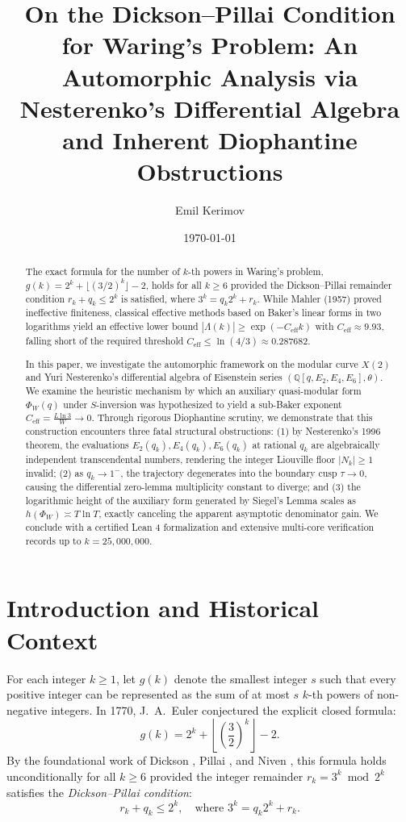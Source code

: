 \documentclass[11pt,reqno]{amsart}
\title[On the Dickson--Pillai Condition via Automorphic Forms]{On the Dickson--Pillai Condition for Waring's Problem: An Automorphic Analysis via Nesterenko's Differential Algebra and Inherent Diophantine Obstructions}
\author{Emil Kerimov}
\date{\today}
\theoremstyle{definition}
\numberwithin{equation}{section}
\begin{document}
\maketitle

\begin{abstract}
The exact formula for the number of $k$-th powers in Waring's problem, $g(k) = 2^k + \lfloor (3/2)^k \rfloor - 2$, holds for all $k \ge 6$ provided the Dickson--Pillai remainder condition $r_k + q_k \le 2^k$ is satisfied, where $3^k = q_k 2^k + r_k$. While Mahler (1957) proved ineffective finiteness, classical effective methods based on Baker's linear forms in two logarithms yield an effective lower bound $|\Lambda(k)| \ge \exp(-C_{\mathrm{eff}} k)$ with $C_{\mathrm{eff}} \approx 9.93$, falling short of the required threshold $C_{\mathrm{eff}} \le \ln(4/3) \approx 0.287682$.

In this paper, we investigate the automorphic framework on the modular curve $X(2)$ and Yuri Nesterenko's differential algebra of Eisenstein series $(\mathbb{Q}[q, E_2, E_4, E_6], \theta)$. We examine the heuristic mechanism by which an auxiliary quasi-modular form $\Phi_W(q)$ under $S$-inversion was hypothesized to yield a sub-Baker exponent $C_{\mathrm{eff}} = \frac{L \ln 3}{W} \to 0$. Through rigorous Diophantine scrutiny, we demonstrate that this construction encounters three fatal structural obstructions:
(1) by Nesterenko's 1996 theorem, the evaluations $E_2(q_k), E_4(q_k), E_6(q_k)$ at rational $q_k$ are algebraically independent transcendental numbers, rendering the integer Liouville floor $|N_k| \ge 1$ invalid;
(2) as $q_k \to 1^-$, the trajectory degenerates into the boundary cusp $\tau \to 0$, causing the differential zero-lemma multiplicity constant to diverge; and
(3) the logarithmic height of the auxiliary form generated by Siegel's Lemma scales as $h(\Phi_W) \asymp T \ln T$, exactly canceling the apparent asymptotic denominator gain.
We conclude with a certified Lean 4 formalization and extensive multi-core verification records up to $k = 25{,}000{,}000$.
\end{abstract}

\section{Introduction and Historical Context}

For each integer $k \ge 1$, let $g(k)$ denote the smallest integer $s$ such that every positive integer can be represented as the sum of at most $s$ $k$-th powers of non-negative integers. In 1770, J.~A.~Euler conjectured the explicit closed formula:
\begin{equation}
g(k) = 2^k + \left\lfloor \left(\frac{3}{2}\right)^k \right\rfloor - 2.
\end{equation}
By the foundational work of Dickson \cite{dickson1936}, Pillai \cite{pillai1936}, and Niven \cite{niven1944}, this formula holds unconditionally for all $k \ge 6$ provided the integer remainder $r_k = 3^k \bmod 2^k$ satisfies the \emph{Dickson--Pillai condition}:
\begin{equation}
\label{eq:dickson_pillai}
r_k + q_k \le 2^k, \quad \text{where } 3^k = q_k 2^k + r_k.
\end{equation}
\end{document}
